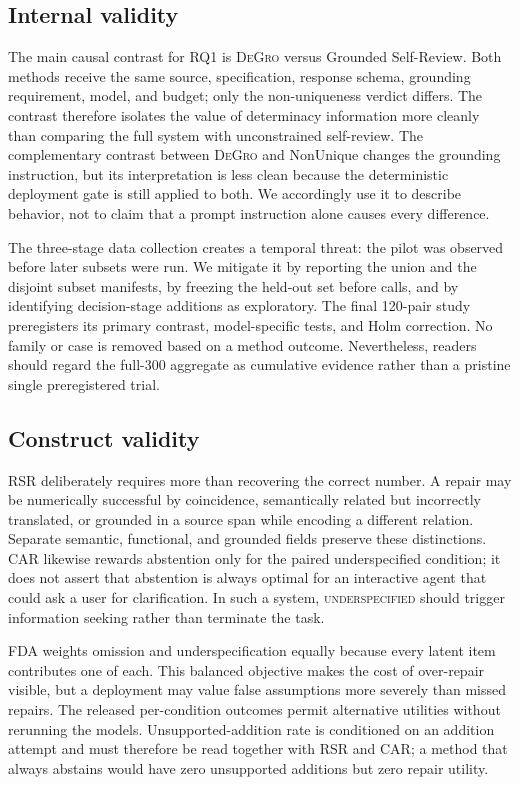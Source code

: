 \documentclass[sigconf,anonymous]{aamas}
\newcommand{\method}{\textsc{DeGro}}
\begin{document}
\subsection{Internal validity}
The main causal contrast for RQ1 is \method{} versus Grounded Self-Review.  Both methods receive the same source, specification, response schema, grounding requirement, model, and budget; only the non-uniqueness verdict differs.  The contrast therefore isolates the value of determinacy information more cleanly than comparing the full system with unconstrained self-review.  The complementary contrast between \method{} and NonUnique changes the grounding instruction, but its interpretation is less clean because the deterministic deployment gate is still applied to both.  We accordingly use it to describe behavior, not to claim that a prompt instruction alone causes every difference.

The three-stage data collection creates a temporal threat: the pilot was observed before later subsets were run.  We mitigate it by reporting the union and the disjoint subset manifests, by freezing the held-out set before calls, and by identifying decision-stage additions as exploratory.  The final 120-pair study preregisters its primary contrast, model-specific tests, and Holm correction.  No family or case is removed based on a method outcome.  Nevertheless, readers should regard the full-300 aggregate as cumulative evidence rather than a pristine single preregistered trial.

\subsection{Construct validity}
RSR deliberately requires more than recovering the correct number.  A repair may be numerically successful by coincidence, semantically related but incorrectly translated, or grounded in a source span while encoding a different relation.  Separate semantic, functional, and grounded fields preserve these distinctions.  CAR likewise rewards abstention only for the paired underspecified condition; it does not assert that abstention is always optimal for an interactive agent that could ask a user for clarification.  In such a system, \textsc{underspecified} should trigger information seeking rather than terminate the task.

FDA weights omission and underspecification equally because every latent item contributes one of each.  This balanced objective makes the cost of over-repair visible, but a deployment may value false assumptions more severely than missed repairs.  The released per-condition outcomes permit alternative utilities without rerunning the models.  Unsupported-addition rate is conditioned on an addition attempt and must therefore be read together with RSR and CAR; a method that always abstains would have zero unsupported additions but zero repair utility.
\end{document}

